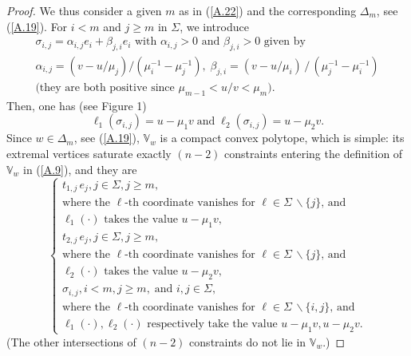 \documentclass[12pt,leqno]{article}
\def\IV{{\mathbb V}}
\begin{document}
\begin{appendix}
\begin{proof}
We thus consider a given $m$ as in (\ref{A.22}) and the corresponding $\Delta_m$, see (\ref{A.19}). For $i < m$ and $j \ge m$ in $\Sigma$, we introduce
\begin{equation}\label{A.23}
\begin{array}{l}
\mbox{$\sigma_{i,j} = \alpha_{i,j} e_i + \beta_{j,i} e_i$ with $\alpha_{i,j} > 0$ and $\beta_{j,i} > 0$ given by}
\\[1ex]
\alpha_{i,j} = (v-u/\mu_j) / (\mu_i^{-1} - \mu_j^{-1}), \; \beta_{j,i} = (v - u/\mu_i) \, / \, (\mu^{-1}_j - \mu^{-1}_i)
\\[1ex]
\mbox{(they are both positive since $\mu_{m-1} < u / v < \mu_m$)}.
\end{array}
\end{equation}
Then, one has (see Figure 1)
\begin{equation}\label{A.24}
\ell_1 (\sigma_{i,j}) = u - \mu_1 v \; \mbox{and} \; \ell_2(\sigma_{i,j}) = u - \mu_2 v.
\end{equation}
Since $w \in \Delta_m$, see (\ref{A.19}), $\IV_w$ is a compact convex polytope, which is simple: its extremal vertices saturate exactly $(n-2)$ constraints entering the definition of $\IV_w$ in (\ref{A.9}), and they are
\begin{equation}\label{A.25}
\left\{ \begin{array}{ll}
t_{1,j} \,e_j, j \in \Sigma, j \ge m, \\
\mbox{where the $\ell$-th coordinate vanishes for $\ell \in \Sigma \,\backslash \{j\}$, and}
\\
 \mbox{$\ell_1(\cdot)$ takes the value $u - \mu_1 v$},
\\[1ex]
t_{2,j} \, e_j, j \in \Sigma, j \ge m,  \\
 \mbox{where the $\ell$-th coordinate vanishes for $\ell \in \Sigma \,\backslash \{j\}$, and}
\\
\mbox{$\ell_2(\cdot)$ takes the value $u - \mu_2 v$},
\\[1ex]
\sigma_{i,j}, i < m, j \ge m, \; \mbox{and $i,j \in \Sigma$}, \\
\mbox{where the $\ell$-th coordinate vanishes for $\ell \in \Sigma \,\backslash \{i,j\}$, and}
\\
 \mbox{$\ell_1(\cdot), \ell_2(\cdot)$ respectively take the value $u - \mu_1 v, u - \mu_2 v$}.
\end{array}\right.
\end{equation}
(The other intersections of $(n-2)$ constraints do not lie in $\IV_{w}$.)


\end{proof}
\end{appendix}
\end{document}
